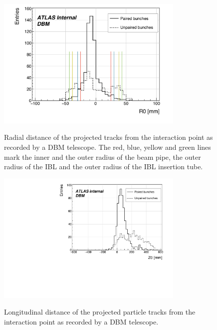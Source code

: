 \documentclass[twoside,11pt]{article}  %
\begin{document}
\baselineskip=15pt

\begin{figure}[!t]
\centering
\includegraphics[width=0.8\textwidth]{D0-add} \label{}
\caption{Radial distance of the projected tracks from the interaction point as recorded by a DBM telescope. The red, blue, yellow and green lines mark the inner and the outer radius of the beam pipe, the outer radius of the IBL and the outer radius of the IBL insertion tube.}
\end{figure}

\begin{figure}[!t]
\centering
\includegraphics[width=0.8\textwidth]{Z0} \label{}
\caption{Longitudinal distance of the projected particle tracks from the interaction point as recorded by a DBM telescope.}
\end{figure}

\end{document}
